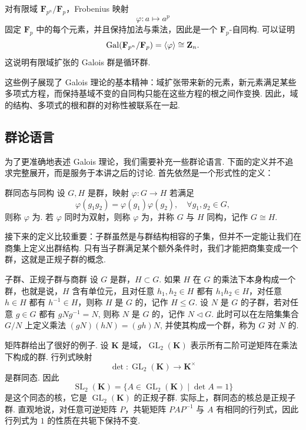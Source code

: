 \begin{example}{}{}
    对有限域 $\mathbf{F}_{p^n}/\mathbf{F}_p$，Frobenius 映射
    \[
        \varphi\colon a\mapsto a^p
    \]
    固定 $\mathbf{F}_p$ 中的每个元素，并且保持加法与乘法，因此是一个 $\mathbf{F}_p$-自同构. 可以证明
    \[
        \operatorname{Gal}(\mathbf{F}_{p^n}/\mathbf{F}_p)=\langle\varphi\rangle\cong\mathbf{Z}_n.
    \]
    这说明有限域扩张的 Galois 群是循环群.
\end{example}

这些例子展现了 Galois 理论的基本精神：域扩张带来新的元素，新元素满足某些多项式方程，而保持基域不变的自同构只能在这些方程的根之间作变换. 因此，域的结构、多项式的根和群的对称性被联系在一起.

\subsection{群论语言}

为了更准确地表述 Galois 理论，我们需要补充一些群论语言. 下面的定义并不追求完整展开，而是服务于本讲之后的讨论. 首先依然是一个形式性的定义：

\begin{definition}{群同态与同构}{}
    设 $G,H$ 是群，映射 $\varphi\colon G\to H$ 若满足
    \[
        \varphi(g_1g_2)=\varphi(g_1)\varphi(g_2),\quad \forall g_1,g_2\in G,
    \]
    则称 $\varphi$ 为. 若 $\varphi$ 同时为双射，则称 $\varphi$ 为，并称 $G$ 与 $H$ 同构，记作 $G\cong H$.
\end{definition}

接下来的定义比较重要：子群虽然是与群结构相容的子集，但并不一定能让我们在商集上定义出群结构. 只有当子群满足某个额外条件时，我们才能把商集变成一个群，这就是正规子群的概念.

\begin{definition}{子群、正规子群与商群}{}
    设 $G$ 是群，$H\subset G$. 如果 $H$ 在 $G$ 的乘法下本身构成一个群，也就是说，$H$ 含有单位元，且对任意 $h_1,h_2\in H$ 都有 $h_1h_2\in H$，对任意 $h\in H$ 都有 $h^{-1}\in H$，则称 $H$ 是 $G$ 的，记作 $H\leq G$. 设 $N$ 是 $G$ 的子群，若对任意 $g\in G$ 都有 $gNg^{-1}=N$, 则称 $N$ 是 $G$ 的，记作 $N\triangleleft G$. 此时可以在左陪集集合 $G/N$ 上定义乘法 $(gN)(hN)=(gh)N$, 并使其构成一个群，称为 $G$ 对 $N$ 的.
\end{definition}

矩阵群给出了很好的例子. 设 $\mathbf{K}$ 是域，$\operatorname{GL}_2(\mathbf{K})$ 表示所有二阶可逆矩阵在乘法下构成的群. 行列式映射
\[
    \det\colon \operatorname{GL}_2(\mathbf{K})\to \mathbf{K}^{\times}
\]
是群同态. 因此
\[
    \operatorname{SL}_2(\mathbf{K})
    =
    \{A\in\operatorname{GL}_2(\mathbf{K})\mid \det A=1\}
\]
是这个同态的核，它是 $\operatorname{GL}_2(\mathbf{K})$ 的正规子群. 实际上，群同态的核总是正规子群. 直观地说，对任意可逆矩阵 $P$，共轭矩阵 $PAP^{-1}$ 与 $A$ 有相同的行列式，因此行列式为 $1$ 的性质在共轭下保持不变.

